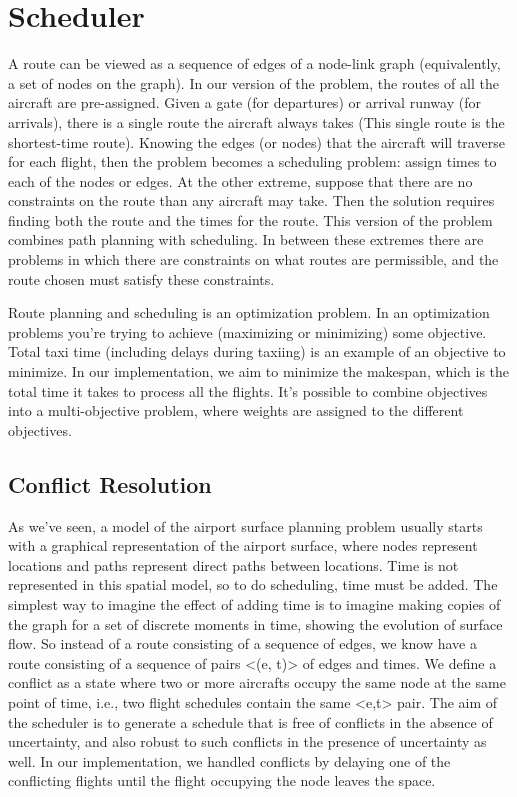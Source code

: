 \documentclass[conference]{IEEEtran}
\begin{document}
\section{Scheduler}

A route can be viewed as a sequence of edges of a node-link graph (equivalently, a set of nodes on the graph). In our version of the problem, the routes of all the aircraft are pre-assigned. Given a gate (for departures) or arrival runway (for arrivals), there is a single route the aircraft always takes (This single route is the shortest-time route). Knowing the edges (or nodes) that the aircraft will traverse for each flight, then the problem becomes a scheduling problem: assign times to each of the nodes or edges. At the other extreme, suppose that there are no constraints on the route than any aircraft may take. Then the solution requires finding both the route and the times for the route. This version of the problem combines path planning with scheduling. In between these extremes there are problems in which there are constraints on what routes are permissible, and the route chosen must satisfy these constraints. 

Route planning and scheduling is an optimization problem. In an optimization problems you're trying to achieve (maximizing or minimizing) some objective. Total taxi time (including delays during taxiing) is an example of an objective to minimize. In our implementation, we aim to  minimize the makespan, which is the total time it takes to process all the flights. It's possible to combine objectives into a multi-objective problem, where weights are assigned to the different objectives.

\subsection{Conflict Resolution}

As we've seen, a model of the airport surface planning problem usually starts with a graphical representation of the airport surface, where nodes represent locations and paths represent direct paths between locations. Time is not represented in this spatial model, so to do scheduling, time must be added. The simplest way to imagine the effect of adding time is to imagine making copies of the graph for a set of discrete moments in time, showing the evolution of surface flow. So instead of a route consisting of a sequence of edges, we know have a route consisting of a sequence of pairs <(e, t)> of edges and times. We define a conflict as a state where two or more aircrafts occupy the same node at the same point of time, i.e., two flight schedules contain the same <e,t> pair. The aim of the scheduler is to generate a schedule that is free of conflicts in the absence of uncertainty, and also robust to such conflicts in the presence of uncertainty as well. In our implementation, we handled conflicts by delaying one of the conflicting flights until the flight occupying the node leaves the space.
\end{document}

